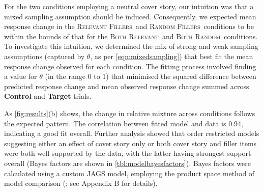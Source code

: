 \documentclass[doc,12pt]{apa}
\newcommand{\relevant}{\textsc{Both Relevant}}
\newcommand{\relevantdata}{\textsc{Relevant Fillers}}
\newcommand{\randomdata}{\textsc{Random Fillers}}
\newcommand{\random}{\textsc{Both Random}}
\begin{document}
For the two conditions employing a neutral cover story, our intuition was that a mixed sampling assumption should be induced. Consequently, we expected mean response change in the \relevantdata\ and \randomdata\ conditions to be within the bounds of that for the \relevant\ and \random\ conditions. To investigate this intuition, we determined the mix of strong and weak sampling assumptions (captured by $\theta$, as per \cref{eqn:mixedsampling}) that best fit the mean response change observed for each condition. The fitting process involved finding a value for $\theta$ (in the range 0 to 1) that minimised the squared difference between predicted response change and mean observed response change summed across {\bf Control} and {\bf Target} trials.

As \cref{fig:results}(b) shows, the change in relative mixture across conditions follows the expected pattern. The correlation between fitted model and data is 0.94, indicating a good fit overall.
%
Further analysis showed that order restricted models suggesting either an effect of cover story only or both cover story and filler items were both well supported by the data, with the latter having strongest support overall (Bayes factors are shown in \cref{tbl:modelbayesfactors}).
Bayes factors were calculated using a custom JAGS model, employing the product space method of model comparison (; see Appendix B for details).
\end{document}

